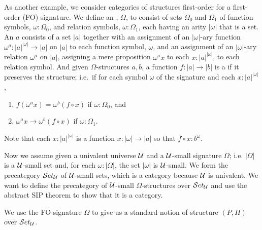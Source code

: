 As another example, we consider categories of structures first-order for a first-order (FO) signature.
We define an , $\Omega$, to consist of sets $\Omega_0$ and $\Omega_1$ of function symbols, $\omega:\Omega_0$, and relation symbols, $\omega:\Omega_1$, each having an arity $|\omega|$ that is a set.
An  $a$ consists of a set $|a|$ together with an assignment of an $|\omega|$-ary function $\omega^a:|a|^{|\omega|}\to |a|$ on $|a|$ to each function symbol, $\omega$, and an assignment of an $|\omega|$-ary relation $\omega^a$ on $|a|$, assigning a mere proposition $\omega^ax$ to each $x:|a|^{|\omega|}$, to each relation symbol.
And given $\Omega$-structures $a,b$, a function $f:|a|\to |b|$ is a  if it preserves the structure; i.e.\ if for each symbol $\omega$ of the signature and each $x:|a|^{|\omega|}$,
\begin{enumerate}
\item $f(\omega^ax) = \omega^b(f\circ x)$ if $\omega:\Omega_0$, and
\item $\omega^ax\to\omega^b(f\circ x)$ if $\omega:\Omega_1$.
\end{enumerate}
Note that each $x:|a|^{|\omega|}$ is a function $x:|\omega|\to |a|$ so that $f\circ x : b^\omega$.

Now we assume given a univalent universe $\mathcal{U}$ and a $\mathcal{U}$-small signature $\Omega$; i.e. $|\Omega|$ is a $\mathcal{U}$-small set and, for each $\omega:|\Omega|$, the set $|\omega|$ is $\mathcal{U}$-small.
We form the precategory $\mathcal{S}et_\mathcal{U}$ of $\mathcal{U}$-small sets, which is a category because $\mathcal{U}$ is univalent.  We want to define the precategory of $\mathcal{U}$-small $\Omega$-structures over $\mathcal{S}et_\mathcal{U}$ and use the abstract SIP theorem to show that it is a category.

We use the FO-signature $\Omega$ to give us a standard notion of structure $(P,H)$ over $\mathcal{S}et_\mathcal{U}$.  

